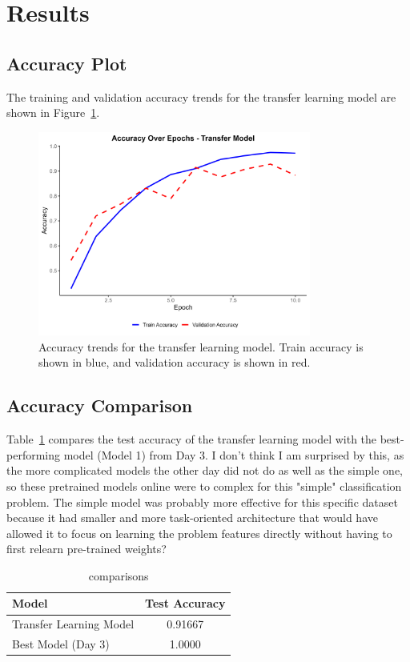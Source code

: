 \documentclass{article}
\begin{document}
\section{Results}

\subsection{Accuracy Plot}
The training and validation accuracy trends for the transfer learning model are shown in Figure~\ref{fig:transfer-accuracy}.

\begin{figure}[h!]
    \centering
    \includegraphics[width=0.8\textwidth]{../results/transfer_model_accuracy.png}
    \caption{Accuracy trends for the transfer learning model. Train accuracy is shown in blue, and validation accuracy is shown in red.}
    \label{fig:transfer-accuracy}
\end{figure}

\subsection{Accuracy Comparison}
Table~\ref{tab:accuracy} compares the test accuracy of the transfer learning model with the best-performing model (Model 1) from Day 3. I don't think I am surprised by this, as the more complicated models the other day did not do as well as the simple one, so these pretrained models online were to complex for this "simple" classification problem. The simple model was probably more effective for this specific dataset because it had smaller and more task-oriented architecture that would have allowed it to focus on learning the problem features directly without having to first relearn pre-trained weights? 

\begin{table}[h!]
    \centering
    \begin{tabular}{l c}
        \hline
        \textbf{Model} & \textbf{Test Accuracy} \\
        \hline
        Transfer Learning Model & 0.91667 \\
        Best Model (Day 3)      & 1.0000 \\
        \hline
    \end{tabular}
    \caption{comparisons}
    \label{tab:accuracy}
\end{table}
\end{document}
